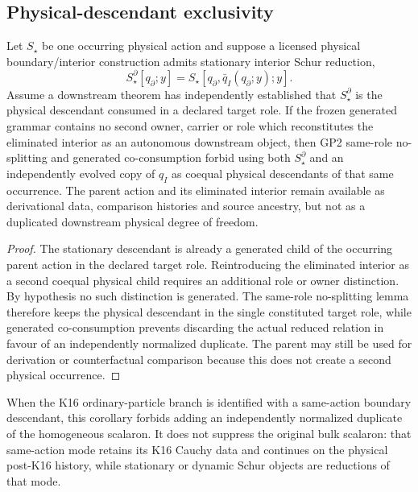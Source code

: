 \documentclass[12pt,a4paper]{article}
\begin{document}
\subsection{Physical-descendant exclusivity}
\label{p2a:sec:v3106-physical-descendant-exclusivity}

\begin{corollary}
\label{p2a:cor:v3106-physical-descendant-exclusivity}
Let $S_\star$ be one occurring physical action and suppose a licensed physical
boundary/interior construction admits stationary interior Schur reduction,
\[
 S_\star^\partial[q_\partial;y]
 =S_\star[q_\partial,\bar q_I(q_\partial;y);y].
\]
Assume a downstream theorem has independently established that
$S_\star^\partial$ is the physical descendant consumed in a declared target
role.  If the frozen generated grammar contains no second owner, carrier or
role which reconstitutes the eliminated interior as an autonomous downstream
object, then GP2 same-role no-splitting and generated co-consumption forbid
using both $S_\star^\partial$ and an independently evolved copy of $q_I$ as
coequal physical descendants of that same occurrence.  The parent action and
its eliminated interior remain available as derivational data, comparison
histories and source ancestry, but not as a duplicated downstream physical
degree of freedom.
\end{corollary}

\begin{proof}
The stationary descendant is already a generated child of the occurring
parent action in the declared target role.  Reintroducing the eliminated
interior as a second coequal physical child requires an additional role or
owner distinction.  By hypothesis no such distinction is generated.  The
same-role no-splitting lemma therefore keeps the physical descendant in the
single constituted target role, while generated co-consumption prevents
discarding the actual reduced relation in favour of an independently
normalized duplicate.  The parent may still be used for derivation or
counterfactual comparison because this does not create a second physical
occurrence.
\end{proof}

\begin{remark}
\label{p2a:rem:v3106-k16-use}
When the K16 ordinary-particle branch is identified with a same-action boundary
descendant, this corollary forbids adding an independently normalized duplicate
of the homogeneous scalaron.  It does not suppress the original bulk scalaron:
that same-action mode retains its K16 Cauchy data and continues on the physical
post-K16 history, while stationary or dynamic Schur objects are reductions of
that mode.
\end{remark}
\end{document}
